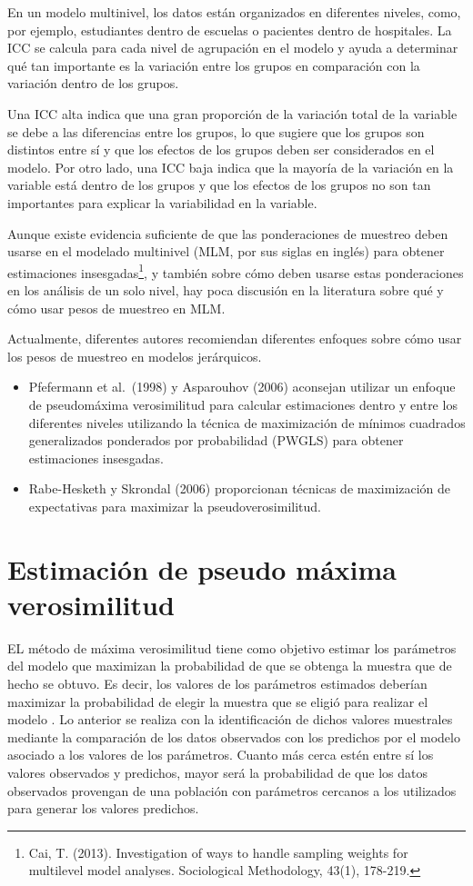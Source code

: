 \documentclass[
  spanish,
  12pt,
]{book}
\begin{document}
En un modelo multinivel, los datos están organizados en diferentes niveles, como, por ejemplo, estudiantes dentro de escuelas o pacientes dentro de hospitales. La ICC se calcula para cada nivel de agrupación en el modelo y ayuda a determinar qué tan importante es la variación entre los grupos en comparación con la variación dentro de los grupos.

Una ICC alta indica que una gran proporción de la variación total de la variable se debe a las diferencias entre los grupos, lo que sugiere que los grupos son distintos entre sí y que los efectos de los grupos deben ser considerados en el modelo. Por otro lado, una ICC baja indica que la mayoría de la variación en la variable está dentro de los grupos y que los efectos de los grupos no son tan importantes para explicar la variabilidad en la variable.

Aunque existe evidencia suficiente de que las ponderaciones de muestreo deben usarse en el modelado multinivel (MLM, por sus siglas en inglés) para obtener estimaciones insesgadas\footnote{Cai, T. (2013). Investigation of ways to handle sampling weights for multilevel model analyses. Sociological Methodology, 43(1), 178-219.}, y también sobre cómo deben usarse estas ponderaciones en los análisis de un solo nivel, hay poca discusión en la literatura sobre qué y cómo usar pesos de muestreo en MLM.

Actualmente, diferentes autores recomiendan diferentes enfoques sobre cómo usar los pesos de muestreo en modelos jerárquicos.

\begin{itemize}
\item
  Pfefermann et al.~(1998) y Asparouhov (2006) aconsejan utilizar un enfoque de pseudomáxima verosimilitud para calcular estimaciones dentro y entre los diferentes niveles utilizando la técnica de maximización de mínimos cuadrados generalizados ponderados por probabilidad (PWGLS) para obtener estimaciones insesgadas.
\item
  Rabe-Hesketh y Skrondal (2006) proporcionan técnicas de maximización de expectativas para maximizar la pseudoverosimilitud.
\end{itemize}

\section{Estimación de pseudo máxima verosimilitud}\label{estimaciuxf3n-de-pseudo-muxe1xima-verosimilitud}

EL método de máxima verosimilitud tiene como objetivo estimar los parámetros del modelo que maximizan la probabilidad de que se obtenga la muestra que de hecho se obtuvo. Es decir, los valores de los parámetros estimados deberían maximizar la probabilidad de elegir la muestra que se eligió para realizar el modelo . Lo anterior se realiza con la identificación de dichos valores muestrales mediante la comparación de los datos observados con los predichos por el modelo asociado a los valores de los parámetros. Cuanto más cerca estén entre sí los valores observados y predichos, mayor será la probabilidad de que los datos observados provengan de una población con parámetros cercanos a los utilizados para generar los valores predichos.
\end{document}
